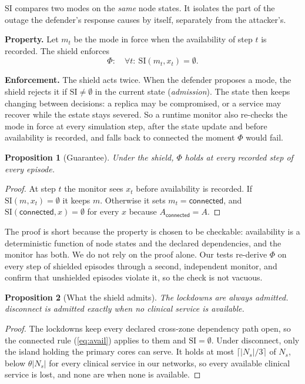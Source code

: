 \documentclass[conference,compsoc]{IEEEtran}
\newtheorem{proposition}{Proposition}
\begin{document}
$\mathrm{SI}$ compares two modes on the \emph{same} node states. It
isolates the part of the outage the defender's response causes by itself,
separately from the attacker's.

\textbf{Property.} Let $m_t$ be the mode in force when the availability
of step $t$ is recorded. The shield enforces
\[
\Phi:\quad \forall t:\ \mathrm{SI}(m_t,x_t)=\emptyset .
\]

\textbf{Enforcement.} The shield acts twice. When the defender proposes a
mode, the shield rejects it if $\mathrm{SI}\neq\emptyset$ in the current
state (\emph{admission}). The state then keeps changing between decisions:
a replica may be compromised, or a service may recover while the estate
stays severed. So a runtime monitor also re-checks the mode in force at
every simulation step, after the state update and before availability is
recorded, and falls back to \textsf{connected} the moment $\Phi$ would fail.

\begin{proposition}[Guarantee]
Under the shield, $\Phi$ holds at every recorded step of every episode.
\end{proposition}
\begin{proof}
At step $t$ the monitor sees $x_t$ before availability is recorded. If
$\mathrm{SI}(m,x_t)=\emptyset$ it keeps $m$. Otherwise it sets
$m_t=\textsf{connected}$, and $\mathrm{SI}(\textsf{connected},x)=\emptyset$ for
every $x$ because $A_{\textsf{connected}}=A$.
\end{proof}

The proof is short because the property is chosen to be checkable:
availability is a deterministic function of node states and the declared
dependencies, and the monitor has both. We do not rely on the proof alone.
Our tests re-derive $\Phi$ on every step of shielded episodes through a
second, independent monitor, and confirm that unshielded episodes violate
it, so the check is not vacuous.

\begin{proposition}[What the shield admits]
The lockdowns are always admitted. \textsf{disconnect} is admitted exactly
when no clinical service is available.
\end{proposition}
\begin{proof}
The lockdowns keep every declared cross-zone dependency path open, so the
connected rule (\ref{eq:avail}) applies to them and $\mathrm{SI}=\emptyset$. Under \textsf{disconnect}, only
the island holding the primary cores can serve. It holds at most
$\lceil |N_s|/3\rceil$ of $N_s$, below $\theta|N_s|$ for every clinical service
in our networks, so every available clinical service is lost, and none are
when none is available.
\end{proof}
\end{document}
